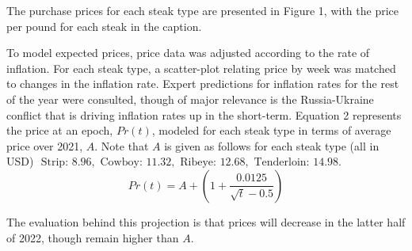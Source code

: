 \documentclass[12pt,a4paper]{article}
\begin{document}
The purchase prices for each steak type are presented in Figure 1, with the price per pound for each steak in the caption.

To model expected prices, price data was adjusted according to the rate of inflation. For each steak type, a scatter-plot relating price by week was matched to changes in the inflation rate. Expert predictions for inflation rates for the rest of the year were consulted, though of major relevance is the Russia-Ukraine conflict that is driving inflation rates up in the short-term. Equation 2 represents the price at an epoch, $Pr(t)$, modeled for each steak type in terms of average price over 2021, $A$. 
Note that $A$ is given as follows for each steak type (all in USD) $\text{ Strip: } 8.96, \text{ Cowboy: } 11.32,$ $\text{Ribeye: } 12.68, \text{ Tenderloin: } 14.98.$
\\

\begin{equation} \label{2}
Pr(t) = A + (1 + \frac{0.0125}{\sqrt{t} - 0.5}) 
\end{equation}

The evaluation behind this projection is that prices will decrease in the latter half of 2022, though remain higher than $A$. 

\newpage
\end{document}

